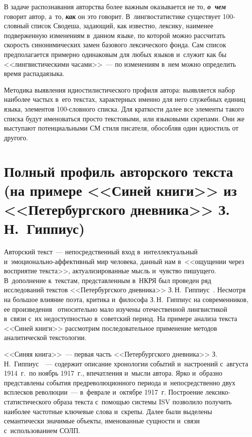 \begin{multicols}{2}
{}
     
     В задаче распознавания авторства более важным оказывается не то, 
{\bfseries\textit{о~чем}} говорит автор, а~то, {\bfseries\textit{как}} он это 
говорит. В~лингвостатистике существует 100-слов\-ный список Сводеша, 
задающий, как известно, лексику, наименее подверженную изменениям 
в~данном языке, по которой можно рассчитать скорость синонимических 
замен базового лексического фонда. Сам список предполагается примерно 
одинаковым для любых языков и~служит как бы <<лингвистическими 
часами>>~--- по изменениям в~нем можно определить время распада\linebreak языка. 
     
     Методика выявления идиостилистического профиля автора: выявляется 
набор наиболее час\-тых в~его текстах, характерных именно для него 
служебных единиц языка, элементов 100-слов\-но\-го списка. Для краткости 
далее все элементы такого списка будут именоваться просто текстовыми, или 
языковыми скрепами. Они же выступают потенциальными 
СМ стиля писателя, обособляя один идиостиль от другого. 
    
   \section{Полный профиль авторского текста (на примере 
<<Синей книги>> из <<Петербургского дневника>> 
З.\,Н.~Гиппиус)}
   
    
     Авторский текст~--- непосредственный вход в~интеллектуальный 
и~эмо\-цио\-наль\-но-аф\-фек\-тив\-ный мир человека, данный нам 
в~<<ощущении через восприятие текста>>, актуализированные мысль 
и~чувство пишущего. В~дополнение к~текстам, представленным 
в~НКРЯ был проведен ряд исследований 
текстов <<Петербургского дневника>> З.\,Н.~Гиппиус~\cite{9-koz, 10-koz}. 
Несмотря на большое влияние поэта, критика и~философа З.\,Н.~Гиппиус на 
современников, ее произведения~\cite{19-koz, 20-koz} относительно мало 
изучены отечественной лингвистикой в~связи с~их не\-до\-ступ\-ностью 
в~советский период. На примере анализа текста <<Синей книги>> 
рассмотрим последовательное применение методов аналитической 
текс\-то\-логии.
     
     <<Синяя книга>>~--- первая часть <<Петербургского дневника>> 
З.\,Н.~Гиппиус~\cite[с.~51--241; 19]{18-koz}~--- содержит описание 
хронологии событий и~настроений с~августа 1914~г.\ по ноябрь 1917~г., 
впечатления и~мысли автора. Ярко и~образно представлены события 
предреволюционного периода и~непосредственно двух всплесков 
революции~--- в~феврале и~октябре 1917~г. Построение 
лек\-си\-ко-ста\-ти\-сти\-че\-ско\-го образа текста с~по\-мощью системы ISV позволило 
получить наиболее частотные ключевые слова и~скрепы. Далее были 
выделены семантически значимые объекты, именованные сущности и~связи 
с~использованием СОЛП.
     

\end{multicols}
